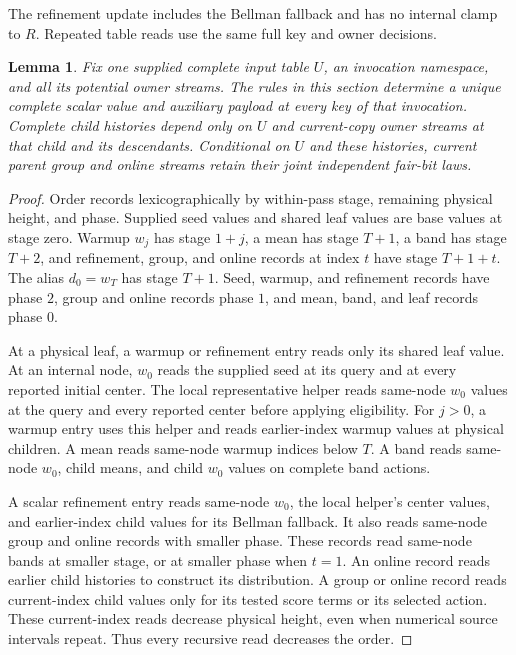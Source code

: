 \documentclass[11pt]{article}
\newtheorem{lemma}[theorem]{Lemma}
\theoremstyle{definition}
\newcommand{\1}{\mathbf 1}
\begin{document}
The refinement update includes the Bellman fallback and has no internal
clamp to $R$. Repeated table reads use the same full key and owner
decisions.

\begin{lemma}\label{refine:lem:semantics}
Fix one supplied complete input table $U$, an invocation namespace, and
all its potential owner streams. The rules in this section determine a
unique complete scalar value and auxiliary payload at every key of that
invocation. Complete child histories depend only on $U$ and current-copy
owner streams at that child and its descendants. Conditional on $U$ and
these histories, current parent group and online streams retain their
joint independent fair-bit laws.
\end{lemma}
\begin{proof}
Order records lexicographically by within-pass stage, remaining
physical height, and phase. Supplied seed values and shared leaf values
are base values at stage zero. Warmup $w_j$ has stage $1+j$, a mean
has stage $T+1$, a band has stage $T+2$, and refinement, group, and
online records at index $t$ have stage $T+1+t$.
The alias $d_0=w_T$ has stage $T+1$.
Seed, warmup, and refinement records have phase $2$, group and online
records phase $1$, and mean, band, and leaf records phase $0$.

At a physical leaf, a warmup or refinement entry reads only its shared
leaf value. At an internal node, $w_0$ reads the supplied seed at its
query and at every reported initial center.
The local representative helper reads same-node $w_0$ values at the
query and every reported center before applying eligibility.
For $j>0$, a warmup entry uses this helper and reads earlier-index
warmup values at physical children.
A mean reads same-node warmup indices below $T$.
A band reads same-node $w_0$, child means, and child $w_0$ values on
complete band actions.

A scalar refinement entry reads same-node $w_0$, the local helper's
center values, and earlier-index child values for its Bellman fallback.
It also reads same-node group and online records with smaller phase.
These records read same-node bands at smaller stage, or at smaller
phase when $t=1$. An online record reads earlier child histories to
construct its distribution. A group or online record reads current-index
child values only for its tested score terms or its selected action.
These current-index reads decrease physical height, even when numerical
source intervals repeat. Thus every recursive read decreases the order.


\end{proof}
\end{document}
